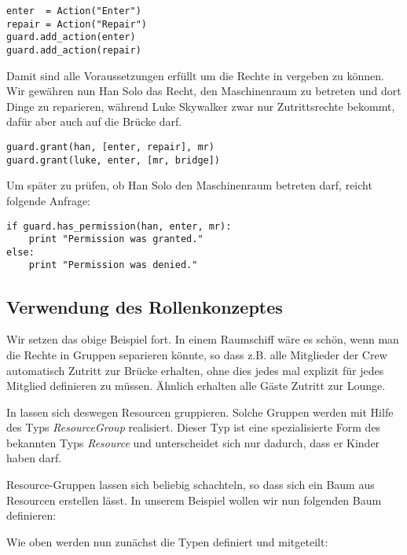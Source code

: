 \begin{lstlisting}
enter  = Action("Enter")
repair = Action("Repair")
guard.add_action(enter)
guard.add_action(repair)
\end{lstlisting}

Damit sind alle Voraussetzungen erfüllt um die Rechte in \product 
vergeben zu können. Wir gewähren nun Han Solo das Recht, den Maschinenraum 
zu betreten und dort Dinge zu reparieren, während Luke Skywalker zwar nur 
Zutrittsrechte bekommt, dafür aber auch auf die Brücke darf.

\begin{lstlisting}
guard.grant(han, [enter, repair], mr)
guard.grant(luke, enter, [mr, bridge])
\end{lstlisting}

Um später zu prüfen, ob Han Solo den Maschinenraum betreten darf, 
reicht folgende Anfrage:

\begin{lstlisting}
if guard.has_permission(han, enter, mr):
    print "Permission was granted."
else:
    print "Permission was denied."
\end{lstlisting}


\subsection{\label{intro:groups}Verwendung des Rollenkonzeptes}

Wir setzen das obige Beispiel fort. In einem Raumschiff wäre es schön, 
wenn man die Rechte in Gruppen separieren könnte, so dass z.B. alle 
Mitglieder der Crew automatisch Zutritt zur Brücke erhalten, ohne dies 
jedes mal explizit für jedes Mitglied definieren zu müssen. Ähnlich 
erhalten alle Gäste Zutritt zur Lounge.

In \product lassen sich deswegen Resourcen gruppieren. Solche Gruppen 
werden mit Hilfe des Typs {\it ResourceGroup} realisiert. Dieser Typ ist 
eine spezialisierte Form des bekannten Typs {\it Resource} und unterscheidet 
sich nur dadurch, dass er Kinder haben darf.

Resource-Gruppen lassen sich beliebig schachteln, so dass sich ein Baum aus 
Resourcen erstellen lässt. In unserem Beispiel wollen wir nun folgenden Baum 
definieren:


Wie oben werden nun zunächst die Typen definiert und \product mitgeteilt:

